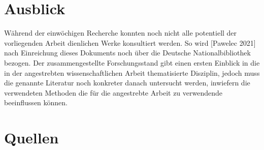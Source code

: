 \documentclass[12pt]{article}
\begin{document}
\section{Ausblick}
Während der einwöchigen Recherche konnten noch nicht alle potentiell der vorliegenden Arbeit dienlichen Werke konsultiert werden. So wird [Pawelec 2021] nach Einreichung dieses Dokuments noch über die Deutsche Nationalbibliothek bezogen.
Der zusammengestellte Forschungsstand gibt einen ersten Einblick in die in der angestrebten wissenschaftlichen Arbeit thematisierte Disziplin, jedoch muss die genannte Literatur noch konkreter danach untersucht werden, inwiefern die verwendeten Methoden die für die angestrebte Arbeit zu verwendende beeinflussen können.
\section{Quellen}
\end{document}
